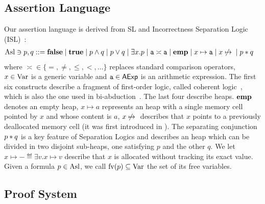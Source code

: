 \subsection{Assertion Language}
Our assertion language is derived from SL and Incorrectness Separation Logic (ISL)~\cite{RBDDOV20}:
\begin{align*}
	\text{Asl} \ni p, q ::= & \; \textbf{false} \mid \textbf{true} \mid p \land q \mid p \lor q \mid \exists x . p \mid \texttt{a} \asymp \texttt{a} \mid \textbf{emp} \mid x \mapsto \texttt{a} \mid x \not\mapsto{} \mid p * q
\end{align*}
where $\asymp \in \{ =, \neq, \le, <, \dots \}$ replaces standard comparison operators, $x \in \text{Var}$ is a generic variable and $\texttt{a} \in \mathsf{AExp}$ is an arithmetic expression. The first six constructs describe a fragment of first-order logic, called coherent logic~\cite{BC05}, which is also the one used in bi-abduction~\cite{CDOY09}. The last four describe heaps.
$\textbf{emp}$ denotes an empty heap, $x \mapsto a$ represents an heap with a single memory cell pointed by $x$ and whose content is $a$, $x \not\mapsto{}$ describes that $x$ points to a previously deallocated memory cell (it was first introduced in \cite{RBDDOV20}).
The separating conjunction $p * q$ is a key feature of Separation Logics and describes an heap which can be divided in two disjoint sub-heaps, one satisfying $p$ and the other $q$.
We let $x \mapsto - \eqdef \exists v. x \mapsto v$ describe that $x$ is allocated without tracking its exact value.
Given a formula $p \in \text{Asl}$, we call $\text{fv}(p) \subseteq \text{Var}$ the set of its free variables.

\subsection{Proof System}\label{sec:sil:sepsil-proof-system}


